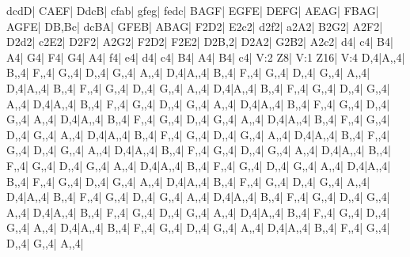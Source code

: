 dcdD| CAEF| DdcB| cfab| gfeg| fedc| BAGF| EGFE|
DEFG| AEAG| FBAG| AGFE| DB,Bc| dcBA| GFEB| ABAG|
F2D2| E2c2| d2f2| a2A2| B2G2| A2F2| D2d2| c2E2|
D2F2| A2G2| F2D2| F2E2| D2B,2| D2A2| G2B2| A2c2|
d4| c4| B4| A4| G4| F4| G4| A4|
f4| e4| d4| c4| B4| A4| B4| c4|
V:2
Z8| 
V:1
Z16| 
V:4
D,4|A,,4| B,,4| F,,4| G,,4| D,,4| G,,4| A,,4|
D,4|A,,4| B,,4| F,,4| G,,4| D,,4| G,,4| A,,4|
D,4|A,,4| B,,4| F,,4| G,,4| D,,4| G,,4| A,,4|
D,4|A,,4| B,,4| F,,4| G,,4| D,,4| G,,4| A,,4|
D,4|A,,4| B,,4| F,,4| G,,4| D,,4| G,,4| A,,4|
D,4|A,,4| B,,4| F,,4| G,,4| D,,4| G,,4| A,,4|
D,4|A,,4| B,,4| F,,4| G,,4| D,,4| G,,4| A,,4|
D,4|A,,4| B,,4| F,,4| G,,4| D,,4| G,,4| A,,4|
D,4|A,,4| B,,4| F,,4| G,,4| D,,4| G,,4| A,,4|
D,4|A,,4| B,,4| F,,4| G,,4| D,,4| G,,4| A,,4|
D,4|A,,4| B,,4| F,,4| G,,4| D,,4| G,,4| A,,4|
D,4|A,,4| B,,4| F,,4| G,,4| D,,4| G,,4| A,,4|
D,4|A,,4| B,,4| F,,4| G,,4| D,,4| G,,4| A,,4|
D,4|A,,4| B,,4| F,,4| G,,4| D,,4| G,,4| A,,4|
D,4|A,,4| B,,4| F,,4| G,,4| D,,4| G,,4| A,,4|
D,4|A,,4| B,,4| F,,4| G,,4| D,,4| G,,4| A,,4|
D,4|A,,4| B,,4| F,,4| G,,4| D,,4| G,,4| A,,4|
D,4|A,,4| B,,4| F,,4| G,,4| D,,4| G,,4| A,,4|
D,4|A,,4| B,,4| F,,4| G,,4| D,,4| G,,4| A,,4|
D,4|A,,4| B,,4| F,,4| G,,4| D,,4| G,,4| A,,4|
D,4|A,,4| B,,4| F,,4| G,,4| D,,4| G,,4| A,,4|
